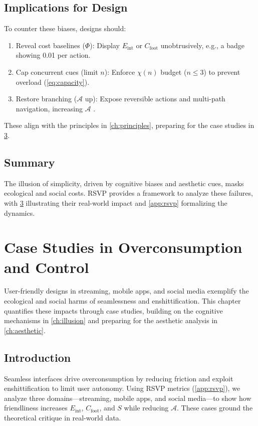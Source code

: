 \documentclass[openany]{book}
\newcommand{\PhiS}{\Phi} %
\newcommand{\Sent}{S} %
\newcommand{\Eint}{E_{\mathrm{int}}} %
\newcommand{\Cfoot}{C_{\mathrm{foot}}} %
\newcommand{\Auton}{\mathcal{A}} %
\newcommand{\kWh}{\mathrm{kWh}}
\begin{document}
\section{Implications for Design}
\label{sec:illusion-implications}
To counter these biases, designs should:
\begin{enumerate}
  \item Reveal cost baselines ($\PhiS$): Display $\Eint$ or $\Cfoot$ unobtrusively, e.g., a badge showing \SI{0.01}{\kWh} per action.
  \item Cap concurrent cues (limit $n$): Enforce $\chi(n)$ budget ($n \leq 3$) to prevent overload (\cref{eq:capacity}).
  \item Restore branching ($\Auton$ up): Expose reversible actions and multi-path navigation, increasing $\Auton$ \citep{doctorow2022}.
\end{enumerate}
These align with the principles in \cref{ch:principles}, preparing for the case studies in \cref{ch:cases}.

\section{Summary}
The illusion of simplicity, driven by cognitive biases and aesthetic cues, masks ecological and social costs. RSVP provides a framework to analyze these failures, with \cref{ch:cases} illustrating their real-world impact and \cref{app:rsvp} formalizing the dynamics.

\chapter{Case Studies in Overconsumption and Control}
\label{ch:cases}

User-friendly designs in streaming, mobile apps, and social media exemplify the ecological and social harms of seamlessness and enshittification. This chapter quantifies these impacts through case studies, building on the cognitive mechanisms in \cref{ch:illusion} and preparing for the aesthetic analysis in \cref{ch:aesthetic}.

\section{Introduction}
\label{sec:cases-intro}
Seamless interfaces drive overconsumption by reducing friction and exploit enshittification to limit user autonomy. Using RSVP metrics (\cref{app:rsvp}), we analyze three domains—streaming, mobile apps, and social media—to show how friendliness increases $\Eint$, $\Cfoot$, and $\Sent$ while reducing $\Auton$. These cases ground the theoretical critique in real-world data.
\end{document}
